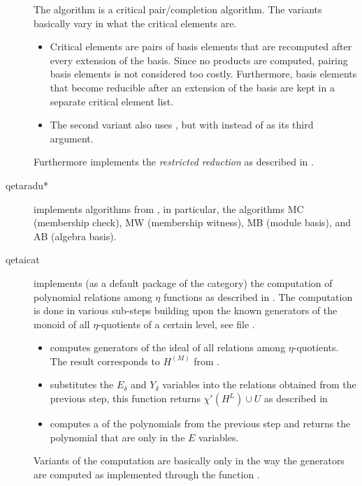 \documentclass{article}
\begin{document}
\begin{description}
  The algorithm \algoSamba{} is a critical pair/completion algorithm.
  The variants basically vary in what the critical elements are.
  \begin{itemize}
  \item {} Critical elements are pairs of basis
    elements that are recomputed after every extension of the basis.
    Since no products are computed, pairing basis elements is not
    considered too costly. Furthermore, basis elements that become
    reducible after an extension of the basis are kept in a separate
    critical element list.
  \item The second variant also uses , but with
     instead of  as
    its third argument.
  \end{itemize}
  Furthermore  implements the \emph{restricted
    reduction} as described in
  \cite{Hemmecke:DancingSambaRamanujan:2018}.

\item[qetaradu*] implements algorithms from
  \cite{Radu:RamanujanKolberg:2015}, in particular, the algorithms MC
  (membership check), MW (membership witness), MB (module basis), and
  AB (algebra basis).

\item[qetaicat] implements (as a default package of the category) the
  computation of polynomial relations among $\eta$ functions as
  described in \cite{Hemmecke+Radu:EtaRelations:2018}. The computation
  is done in various sub-steps building upon the known generators of
  the monoid of all $\eta$-quotients of a certain level, see file
  .
  \begin{itemize}
  \item {} computes generators of the
    ideal of all relations among $\eta$-quotients. The result
    corresponds to $H^{(M)}$ from
    \cite[Chapter~7]{Hemmecke+Radu:EtaRelations:2018}.
  \item {} substitutes the $E_\delta$
    and $Y_\delta$ variables into the relations obtained from the
    previous step, this function returns $\chi'(H^L)\cup U$ as
    described in \cite[Chapter~7]{Hemmecke+Radu:EtaRelations:2018}
  \item {} computes a \GB{} of the polynomials from
    the previous step and returns the polynomial that are only in the
    $E$ variables.
  \end{itemize}
  Variants of the computation are basically only in the way the
  generators are computed as implemented through the function
  .


\end{description}
\end{document}
